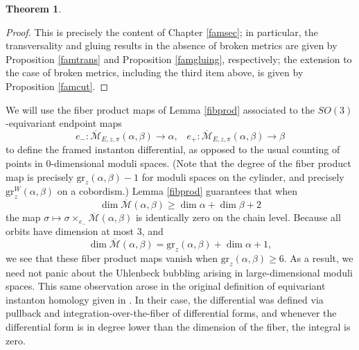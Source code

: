 \documentclass[10pt,a4paper]{amsart}
\newtheorem{theorem}{Theorem}
\theoremstyle{definition}
\theoremstyle{remark}
\numberwithin{figure}{qchap}
\begin{document}
\begin{theorem}
\begin{enumerate}
\end{enumerate}
\end{theorem}

\begin{proof}
This is precisely the content of Chapter \ref{famsec}; in particular, the transversality and gluing results in the absence of broken metrics are given by Proposition \ref{famtrans} and Proposition \ref{famgluing}, respectively; the extension to the case of broken metrics, including the third item above, is given by Proposition \ref{famcut}.
\end{proof}

We will use the fiber product maps of Lemma \ref{fibprod} associated to the $SO(3)$-equivariant endpoint maps $$e_-: \overline{\mathcal M}_{E,z,\pi}(\alpha, \beta) \to \alpha, \;\;\; e_+: \overline{\mathcal M}_{E,z,\pi}(\alpha, \beta) \to \beta$$ to define the framed instanton differential, as opposed to the usual counting of points in 0-dimensional moduli spaces. (Note that the degree of the fiber product map is precisely $\text{gr}_z(\alpha, \beta) - 1$ for moduli spaces on the cylinder, and precisely $\text{gr}_z^W(\alpha, \beta)$ on a cobordism.) Lemma \ref{fibprod} guarantees that when
$$\dim \overline{\mathcal M}(\alpha, \beta) \geq \dim \alpha + \dim \beta + 2$$
the map $\sigma \mapsto \sigma \times_{e_-} \overline{\mathcal M}(\alpha, \beta)$ is identically zero on the chain level. Because all orbits have dimension at most $3$, and
$$\dim \overline{\mathcal M}(\alpha, \beta) = \text{gr}_z(\alpha, \beta) + \dim \alpha+1,$$
we see that these fiber product maps vanish when $\text{gr}_z(\alpha, \beta) \geq 6$. As a result, we need not panic about the Uhlenbeck bubbling arising in large-dimensional moduli spaces. This same observation arose in the original definition of equivariant instanton homology given in \cite{AB}. In their case, the differential was defined via pullback and integration-over-the-fiber of differential forms, and whenever the differential form is in degree lower than the dimension of the fiber, the integral is zero.
\end{document}

